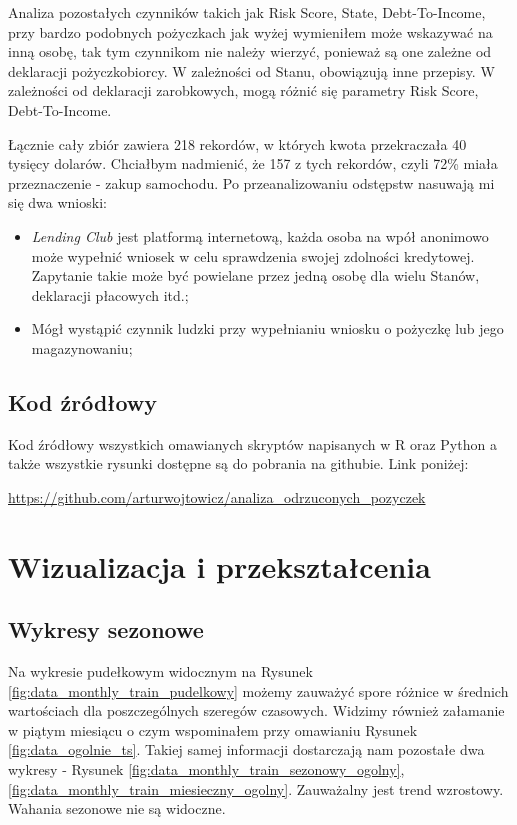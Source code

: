 \documentclass[11pt]{article}
\begin{document}
Analiza pozostałych czynników takich jak Risk Score, State, Debt-To-Income, przy bardzo podobnych pożyczkach jak wyżej wymieniłem może wskazywać na inną osobę, tak tym czynnikom nie należy wierzyć, ponieważ są one zależne od deklaracji pożyczkobiorcy. W zależności od Stanu, obowiązują inne przepisy. W zależności od deklaracji zarobkowych, mogą różnić się parametry Risk Score, Debt-To-Income. 

Łącznie cały zbiór zawiera 218 rekordów, w których kwota przekraczała 40 tysięcy dolarów. Chciałbym nadmienić, że 157 z tych rekordów, czyli 72\% miała przeznaczenie - zakup samochodu.
Po przeanalizowaniu odstępstw nasuwają mi się dwa wnioski:

\begin{itemize}
\item \textit{Lending Club} jest platformą internetową, każda osoba na wpół anonimowo może wypełnić wniosek w celu sprawdzenia swojej zdolności kredytowej. Zapytanie takie może być powielane przez jedną osobę dla wielu Stanów, deklaracji płacowych itd.;
\item Mógł wystąpić czynnik ludzki przy wypełnianiu wniosku o pożyczkę lub jego magazynowaniu;
\end{itemize}

\subsection{Kod źródłowy}

Kod źródłowy wszystkich omawianych skryptów napisanych w R oraz Python a także wszystkie rysunki dostępne są do pobrania na githubie. Link poniżej: 
\begin{center}
\url{https://github.com/arturwojtowicz/analiza_odrzuconych_pozyczek}
\end{center}

\newpage

\section{Wizualizacja i przekształcenia}

\subsection{Wykresy sezonowe}

Na wykresie pudełkowym widocznym na Rysunek \ref{fig:data_monthly_train_pudelkowy} możemy zauważyć spore różnice w średnich wartościach dla poszczególnych szeregów czasowych. Widzimy również załamanie w piątym miesiącu o czym wspominałem przy omawianiu Rysunek \ref{fig:data_ogolnie_ts}. Takiej samej informacji dostarczają nam pozostałe dwa wykresy - Rysunek  \ref{fig:data_monthly_train_sezonowy_ogolny}, \ref{fig:data_monthly_train_miesieczny_ogolny}. Zauważalny jest trend wzrostowy. Wahania sezonowe nie są widoczne.
\end{document}

